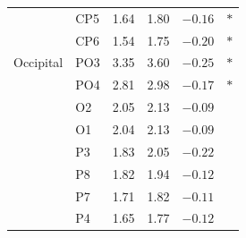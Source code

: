 \documentclass[journal,twoside,web]{ieeecolor}
\begin{document}
\begin{table}[htbp]
\begin{tabular}{@{}llrrrc@{}}
     & CP5 & 1.64 & 1.80 & $-0.16$ & $*$ \\
     & CP6 & 1.54 & 1.75 & $-0.20$ & $*$ \\
    \addlinespace
    Occipital & PO3 & 3.35 & 3.60 & $-0.25$ & $*$ \\
     & PO4 & 2.81 & 2.98 & $-0.17$ & $*$ \\
     & O2 & 2.05 & 2.13 & $-0.09$ & \\
     & O1 & 2.04 & 2.13 & $-0.09$ & \\
     & P3 & 1.83 & 2.05 & $-0.22$ & \\
     & P8 & 1.82 & 1.94 & $-0.12$ & \\
     & P7 & 1.71 & 1.82 & $-0.11$ & \\
     & P4 & 1.65 & 1.77 & $-0.12$ & \\
    \bottomrule
  \end{tabular}
\end{table}
\end{document}
